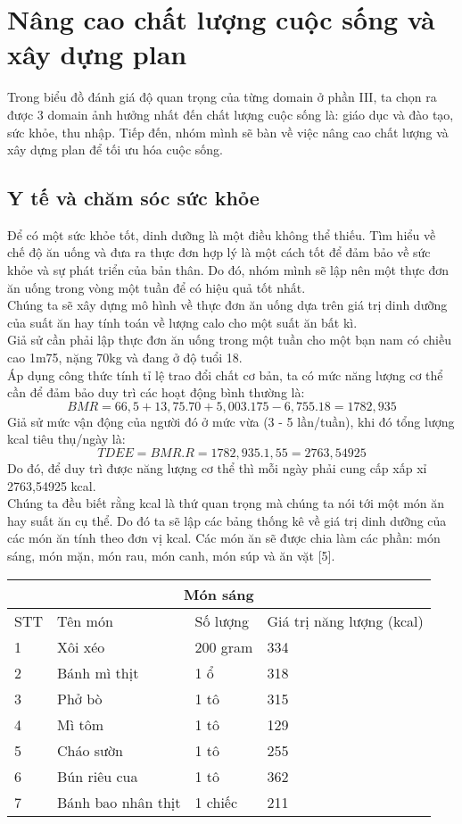 \section{Nâng cao chất lượng cuộc sống và xây dựng plan}
Trong biểu đồ đánh giá độ quan trọng của từng domain ở phần III, ta chọn ra được $3$ domain ảnh hưởng nhất đến chất lượng cuộc sống là: giáo dục và đào tạo, sức khỏe, thu nhập. Tiếp đến, nhóm mình sẽ bàn về việc nâng cao chất lượng và xây dựng plan để tối ưu hóa cuộc sống.
\subsection{Y tế và chăm sóc sức khỏe}
Để có một sức khỏe tốt, dinh dưỡng là một điều không thể thiếu. Tìm hiểu về chế độ ăn uống và đưa ra thực đơn hợp lý là một cách tốt để đảm bảo về sức khỏe và sự phát triển của bản thân. Do đó, nhóm mình sẽ lập nên một thực đơn ăn uống trong vòng một tuần để có hiệu quả tốt nhất.\\
Chúng ta sẽ xây dựng mô hình về thực đơn ăn uống dựa trên giá trị dinh dưỡng của suất ăn hay tính toán về lượng calo cho một suất ăn bất kì.\\
Giả sử cần phải lập thực đơn ăn uống trong một tuần cho một bạn nam có chiều cao 1m75, nặng 70kg và đang ở độ tuổi 18.\\
Áp dụng công thức tính tỉ lệ trao đổi chất cơ bản, ta có mức năng lượng cơ thể cần để đảm bảo duy trì các hoạt động bình thường là:
$$BMR = 66,5 + 13,75.70 + 5,003.175 - 6,755.18 = 1782,935$$
Giả sử mức vận động của người đó ở mức vừa (3 - 5 lần/tuần), khi đó tổng lượng kcal tiêu thụ/ngày là:
$$TDEE = BMR.R = 1782,935.1,55 = 2763,54925$$
Do đó, để duy trì được năng lượng cơ thể thì mỗi ngày phải cung cấp xấp xỉ 2763,54925 kcal.\\
Chúng ta đều biết rằng kcal là thứ quan trọng mà chúng ta nói tới một món ăn hay suất ăn cụ thể. Do đó ta sẽ lập các bảng thống kê về giá trị dinh dưỡng của các món ăn tính theo đơn vị kcal. Các món ăn sẽ được chia làm các phần: món sáng, món mặn, món rau, món canh, món súp và ăn vặt [5].
\begin{center}
\begin{tabular}{ | m{1cm} | m{4cm}| m{3cm} | m{4cm}|}
 \hline
 \multicolumn{4}{|c|}{Món sáng} \\
 \hline
  STT& Tên món & Số lượng & Giá trị năng lượng (kcal) \\ 
\hline
  1 & Xôi xéo & 200 gram & 334 \\ 
 \hline
  2 & Bánh mì thịt & 1 ổ & 318 \\ 
 \hline
   3& Phở bò & 1 tô & 315 \\ 
 \hline
   4 & Mì tôm & 1 tô & 129 \\ 
 \hline
   5 & Cháo sườn & 1 tô & 255 \\ 
 \hline
   6 & Bún riêu cua & 1 tô & 362 \\ 
 \hline
   7 & Bánh bao nhân thịt & 1 chiếc & 211 \\ 
 \hline
\end{tabular}
\end{center}


